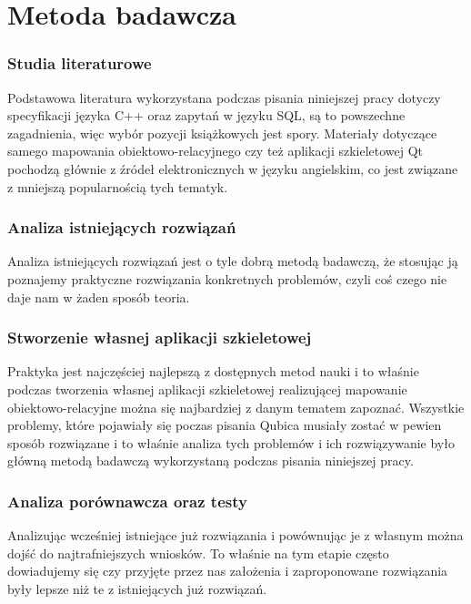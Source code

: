 \documentclass[12pt]{report}
\begin{document}
\section{Metoda badawcza}

\subsubsection{Studia literaturowe} %

Podstawowa literatura wykorzystana podczas pisania niniejszej pracy dotyczy specyfikacji języka C++ oraz zapytań w języku SQL, są to powszechne zagadnienia, więc wybór
pozycji książkowych jest spory. Materiały dotyczące samego mapowania obiektowo-relacyjnego czy też aplikacji szkieletowej Qt pochodzą głównie z źródeł elektronicznych w 
języku angielskim, co jest związane z mniejszą popularnością tych tematyk.

\subsubsection{Analiza istniejących rozwiązań}

Analiza istniejących rozwiązań jest o tyle dobrą metodą badawczą, że stosując ją poznajemy praktyczne rozwiązania konkretnych problemów, czyli coś czego nie daje nam w
żaden sposób teoria.

\subsubsection{Stworzenie własnej aplikacji szkieletowej}

Praktyka jest najczęściej najlepszą z dostępnych metod nauki i to właśnie podczas tworzenia własnej aplikacji szkieletowej realizującej mapowanie obiektowo-relacyjne można
się najbardziej z danym tematem zapoznać. Wszystkie problemy, które pojawiały się poczas pisania Qubica musiały zostać w pewien sposób roz\-wią\-zane i to właśnie analiza
tych problemów i ich rozwiązywanie było główną metodą badawczą wykorzystaną podczas pisania niniejszej pracy.

\subsubsection{Analiza porównawcza oraz testy}

Analizując wcześniej istniejące już rozwiązania i powównując je z własnym można dojść do najtrafniejszych wniosków. To właśnie na tym etapie często dowiadujemy się czy
przyjęte przez nas założenia i zaproponowane rozwiązania były lepsze niż te z istniejących już rozwiązań. 
\end{document}
